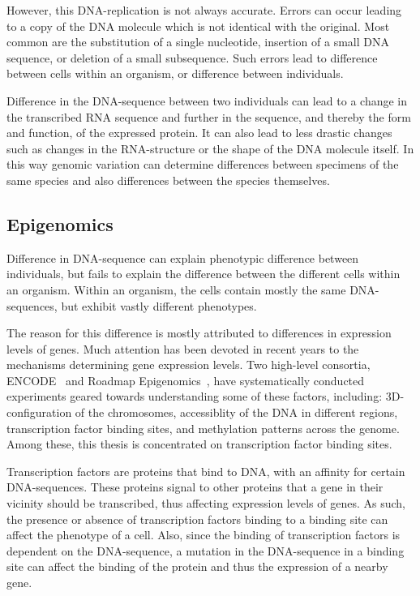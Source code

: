 However, this DNA-replication is not always accurate.
Errors can occur leading to a copy of the DNA molecule which is not identical with the original.
Most common are the substitution of a single nucleotide, insertion of a small DNA sequence, or deletion of a small subsequence.
Such errors lead to difference between cells within an organism, or difference between individuals.

Difference in the DNA-sequence between two individuals can lead to a change in the transcribed RNA sequence and further in the sequence, and thereby the form and function, of the expressed protein.
It can also lead to less drastic changes such as changes in the RNA-structure or the shape of the DNA molecule itself.
In this way genomic variation can determine differences between specimens of the same species and also differences between the species themselves.

\subsection{Epigenomics}
Difference in DNA-sequence can explain phenotypic
difference between individuals, but fails to explain the difference between the different cells within an organism.
Within an organism, the cells contain mostly the same DNA-sequences, but exhibit vastly different phenotypes.

The reason for this difference is mostly attributed to differences in expression levels of genes.
Much attention has been devoted in recent years to the mechanisms determining gene expression levels.
Two high-level consortia, ENCODE~\cite{encode} and Roadmap Epigenomics~\cite{roadmap}, have systematically conducted experiments geared towards understanding some of these factors, including: 3D-configuration of the chromosomes, accessiblity of the DNA in different regions, transcription factor binding sites, and methylation patterns across the genome.
Among these, this thesis is concentrated on transcription factor binding sites.

Transcription factors are proteins that bind to DNA, with an affinity for certain DNA-sequences.
These proteins signal to other proteins that a gene in their vicinity should be transcribed, thus affecting expression levels of genes.
As such, the presence or absence of transcription factors binding to a binding site can affect the phenotype of a cell.
Also, since the binding of transcription factors is dependent on the DNA-sequence, a mutation in the DNA-sequence in a binding site can affect the binding of the protein and thus the expression of a nearby gene. 

